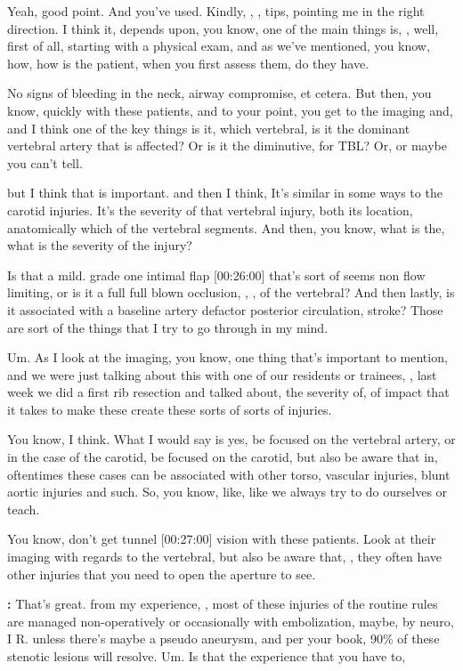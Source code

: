 \documentclass[
]{book}
\begin{document}
Yeah, good
point. And you've used. Kindly, , , tips, pointing me in the right
direction. I think it, depends upon, you know, one of the main things
is, , well, first of all, starting with a physical exam, and as we've
mentioned, you know, how, how is the patient, when you first assess
them, do they have.

No signs of bleeding in the neck, airway compromise, et cetera. But
then, you know, quickly with these patients, and to your point, you get
to the imaging and, and I think one of the key things is it, which
vertebral, is it the dominant vertebral artery that is affected? Or is
it the diminutive, for TBL? Or, or maybe you can't tell.

but I think that is important. and then I think, It's similar in
some ways to the carotid injuries. It's the severity of that vertebral
injury, both its location, anatomically which of the vertebral
segments. And then, you know, what is the, what is the severity of the
injury?

Is that a mild. grade one intimal flap {[}00:26:00{]} that's sort of seems
non flow limiting, or is it a full full blown occlusion, , , of the
vertebral? And then lastly, is it associated with a baseline artery
defactor posterior circulation, stroke? Those are sort of the things
that I try to go through in my mind.

Um. As I look at the imaging, you know, one thing that's important to
mention, and we were just talking about this with one of our residents
or trainees, , last week we did a first rib resection and talked about,
the severity of, of impact that it takes to make these create these
sorts of sorts of injuries.

You know, I think. What I would say is yes, be focused on the vertebral
artery, or in the case of the carotid, be focused on the carotid, but
also be aware that in, oftentimes these cases can be associated with
other torso, vascular injuries, blunt aortic injuries and such. So, you
know, like, like we always try to do ourselves or teach.

You know, don't get tunnel {[}00:27:00{]} vision with these patients. Look
at their imaging with regards to the vertebral, but also be aware that,
, they often have other injuries that you need to open the aperture to
see.

\textbf{:} That's great.
from my experience, , most of these injuries of the routine rules are
managed non-operatively or occasionally with embolization, maybe, by
neuro, I R. unless there's maybe a pseudo aneurysm, and per your book,
90\% of these stenotic lesions will resolve. Um. Is that the experience
that you have to,
\end{document}
